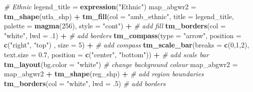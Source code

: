 \documentclass[]{book}
\newenvironment{Shaded}{\begin{snugshade}}{\end{snugshade}}
\newcommand{\KeywordTok}[1]{\textcolor[rgb]{0.13,0.29,0.53}{\textbf{#1}}}
\newcommand{\DataTypeTok}[1]{\textcolor[rgb]{0.13,0.29,0.53}{#1}}
\newcommand{\DecValTok}[1]{\textcolor[rgb]{0.00,0.00,0.81}{#1}}
\newcommand{\FloatTok}[1]{\textcolor[rgb]{0.00,0.00,0.81}{#1}}
\newcommand{\StringTok}[1]{\textcolor[rgb]{0.31,0.60,0.02}{#1}}
\newcommand{\CommentTok}[1]{\textcolor[rgb]{0.56,0.35,0.01}{\textit{#1}}}
\newcommand{\OperatorTok}[1]{\textcolor[rgb]{0.81,0.36,0.00}{\textbf{#1}}}
\newcommand{\NormalTok}[1]{#1}
\begin{document}
\begin{Shaded}
\begin{Highlighting}[]
  \CommentTok{# Ethnic}
\NormalTok{legend_title =}\StringTok{ }\KeywordTok{expression}\NormalTok{(}\StringTok{"Ethnic"}\NormalTok{)}
\NormalTok{map_abgwr2 =}\StringTok{ }\KeywordTok{tm_shape}\NormalTok{(utla_shp) }\OperatorTok{+}
\StringTok{  }\KeywordTok{tm_fill}\NormalTok{(}\DataTypeTok{col =} \StringTok{"amb_ethnic"}\NormalTok{, }\DataTypeTok{title =}\NormalTok{ legend_title, }\DataTypeTok{palette =} \KeywordTok{magma}\NormalTok{(}\DecValTok{256}\NormalTok{), }\DataTypeTok{style =} \StringTok{"cont"}\NormalTok{) }\OperatorTok{+}\StringTok{ }\CommentTok{# add fill}
\StringTok{  }\KeywordTok{tm_borders}\NormalTok{(}\DataTypeTok{col =} \StringTok{"white"}\NormalTok{, }\DataTypeTok{lwd =}\NormalTok{ .}\DecValTok{1}\NormalTok{)  }\OperatorTok{+}\StringTok{ }\CommentTok{# add borders}
\StringTok{  }\KeywordTok{tm_compass}\NormalTok{(}\DataTypeTok{type =} \StringTok{"arrow"}\NormalTok{, }\DataTypeTok{position =} \KeywordTok{c}\NormalTok{(}\StringTok{"right"}\NormalTok{, }\StringTok{"top"}\NormalTok{) , }\DataTypeTok{size =} \DecValTok{5}\NormalTok{) }\OperatorTok{+}\StringTok{ }\CommentTok{# add compass}
\StringTok{  }\KeywordTok{tm_scale_bar}\NormalTok{(}\DataTypeTok{breaks =} \KeywordTok{c}\NormalTok{(}\DecValTok{0}\NormalTok{,}\DecValTok{1}\NormalTok{,}\DecValTok{2}\NormalTok{), }\DataTypeTok{text.size =} \FloatTok{0.7}\NormalTok{, }\DataTypeTok{position =}  \KeywordTok{c}\NormalTok{(}\StringTok{"center"}\NormalTok{, }\StringTok{"bottom"}\NormalTok{)) }\OperatorTok{+}\StringTok{ }\CommentTok{# add scale bar}
\StringTok{  }\KeywordTok{tm_layout}\NormalTok{(}\DataTypeTok{bg.color =} \StringTok{"white"}\NormalTok{) }\CommentTok{# change background colour}
\NormalTok{map_abgwr2 =}\StringTok{ }\NormalTok{map_abgwr2 }\OperatorTok{+}\StringTok{ }\KeywordTok{tm_shape}\NormalTok{(reg_shp) }\OperatorTok{+}\StringTok{ }\CommentTok{# add region boundaries}
\StringTok{  }\KeywordTok{tm_borders}\NormalTok{(}\DataTypeTok{col =} \StringTok{"white"}\NormalTok{, }\DataTypeTok{lwd =}\NormalTok{ .}\DecValTok{5}\NormalTok{) }\CommentTok{# add borders}


\end{Highlighting}
\end{Shaded}
\end{document}
